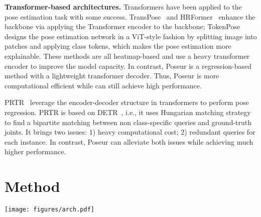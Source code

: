\documentclass[runningheads]{llncs}
\def\handle{{Poseur}\xspace}
\begin{document}
\noindent\textbf{Transformer-based architectures.} Transformers have been applied to the pose estimation task with some success. 
TransPose~\cite{yang2021transpose} and HRFormer~\cite{yuan2021hrformer} enhance the backbone via applying the Transformer encoder to the backbone; TokenPose~\cite{li2021tokenpose} designs the pose estimation network in a ViT-style fashion by splitting image into patches and applying class tokens, which makes the pose estimation more explainable. These methods are all heatmap-based and use a heavy transformer encoder to improve the model capacity. In contrast, Poseur is a regression-based method with a lightweight transformer decoder. Thus, Poseur is more computational efficient while can still achieve high performance. 







PRTR~\cite{li2021PRTR} leverage the encoder-decoder structure in transformers to perform pose regression. PRTR is based on DETR~\cite{carion2020end}, i.e., it uses Hungarian matching strategy to find a bipartite matching between non class-specific queries and ground-truth joints.  It brings two issues: 1) heavy computational cost; 2) redundant queries for each instance. In contrast, \handle can alleviate both issues while achieving much higher performance.















\section{Method}


\begin{figure*}[t]
\centering 
\texttt{[image: figures/arch.pdf]}
\caption{\textbf{The architecture of \handle.}
The model directly predicts a sequence of keypoint coordinates in parallel by combining (a) backbone network with (b) keypoint encoder and (c) query decoder. (d) Residual Log-likelihood Estimation~\cite{li2021rle}. (e) The proposed uncertainty score for our method.
}
\label{fig:framework}
\end{figure*}
\end{document}
